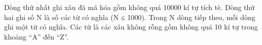Dòng thứ nhất ghi xâu đã mã hóa gồm không quá 10000 kí tự tích tè. Dòng thứ hai ghi số N là số các từ có nghĩa (N ≤ 1000). Trong N dòng tiếp theo, mỗi dòng ghi một từ có nghĩa. Các từ là các xâu không rỗng gồm không quá 10 kí tự trong khoảng “A” đến “Z”.
